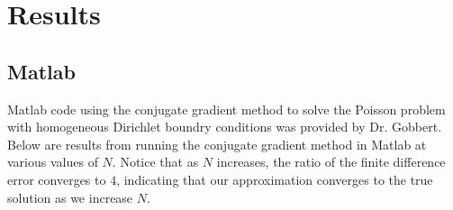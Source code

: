 \documentclass[11pt]{article}
\begin{document}
\section{Results}
\subsection{Matlab}
Matlab code using the conjugate gradient method to solve the Poisson problem with homogeneous Dirichlet boundry conditions was provided by Dr. Gobbert. Below are results from running the conjugate gradient method in Matlab at various values of $N$. Notice that as $N$ increases, the ratio of the finite difference error converges to $4$, indicating that our approximation converges to the true solution as we increase $N$. 
\begin{table}[!htbp]
\end{table}
\pagebreak
\end{document}
